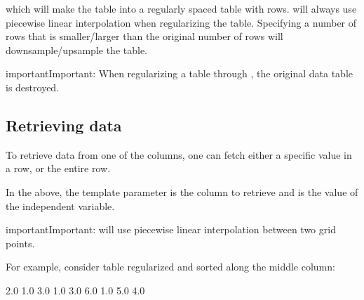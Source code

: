 \documentclass[letterpaper,10pt,english]{sphinxmanual}
\begin{document}
which will make the table into a regularly spaced table with  rows.
 will always use piecewise linear interpolation when regularizing the table.
Specifying a number of rows that is smaller/larger than the original number of rows will downsample/upsample the table.

\begin{sphinxadmonition}{important}{Important:}
When regularizing a table through , the original data table is destroyed.
\end{sphinxadmonition}


\subsection{Retrieving data}
\label{\detokenize{Utilities/LookupTable:retrieving-data}}
To retrieve data from one of the columns, one can fetch either a specific value in a row, or the entire row.

\begin{sphinxVerbatim}[commandchars=\\\{\},formatcom=\scriptsize]
 
   

    
\end{sphinxVerbatim}

In the above, the template parameter  is the column to retrieve and  is the value of the independent variable.

\begin{sphinxadmonition}{important}{Important:}
 will  use piecewise linear interpolation between two grid points.
\end{sphinxadmonition}

For example, consider table regularized and sorted along the middle column:

\begin{sphinxVerbatim}[commandchars=\\\{\},formatcom=\scriptsize]
2.0  1.0  3.0
1.0  3.0  6.0
1.0  5.0  4.0
\end{sphinxVerbatim}
\end{document}
